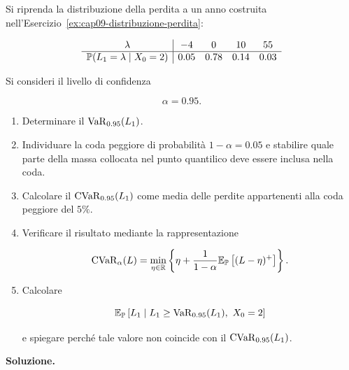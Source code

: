 \begin{exercise}

\label{ex:cap09-var-cvar-discreti}

Si riprenda la distribuzione della perdita a un anno costruita
nell'Esercizio~\ref{ex:cap09-distribuzione-perdita}:

\[
\begin{array}{c|cccc}
\lambda
&
-4
&
0
&
10
&
55
\\
\hline
\mathbb{P}(L_1=\lambda\mid X_0=2)
&
0.05
&
0.78
&
0.14
&
0.03
\end{array}
\]

Si consideri il livello di confidenza

\[
\alpha=0.95.
\]

\begin{enumerate}

\item Determinare il $\operatorname{VaR}_{0.95}(L_1)$.

\item Individuare la coda peggiore di probabilit\`{a} $1-\alpha=0.05$
e stabilire quale parte della massa collocata nel punto quantilico
deve essere inclusa nella coda.

\item Calcolare il $\operatorname{CVaR}_{0.95}(L_1)$ come media delle perdite
appartenenti alla coda peggiore del $5\%$.

\item Verificare il risultato mediante la rappresentazione

\[
\operatorname{CVaR}_{\alpha}(L)
=
\min_{\eta\in\mathbb{R}}
\left\{
\eta
+
\frac{1}{1-\alpha}
\mathbb{E}_{\mathbb{P}}
\left[
(L-\eta)^{+}
\right]
\right\}.
\]

\item Calcolare

\[
\mathbb{E}_{\mathbb{P}}
\left[
L_1
\mid
L_1\geq\operatorname{VaR}_{0.95}(L_1),\ X_0=2
\right]
\]

e spiegare perch\'{e} tale valore non coincide con il
$\operatorname{CVaR}_{0.95}(L_1)$.

\end{enumerate}

\end{exercise}

\noindent
\textbf{Soluzione.}

